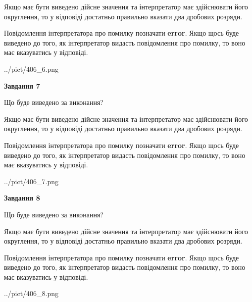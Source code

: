 \documentclass[12pt, ukrainian]{article}
\begin{document}
{\begin {Large}
Якщо має бути виведено дійсне значення та інтерпретатор має здійснювати його округлення, 
то у відповіді достатньо правильно вказати два дробових розряди.

Повідомлення інтерпретатора про помилку позначати \textbf{error}.
Якщо щось буде виведено до того, як інтерпретатор видасть повідомлення про помилку, 
то воно має вказуватись у відповіді. \par

\begin{center}
	{../pict/406_6.png}
\end{center}
\newpage

{\begin {center}\textbf{Завдання 7}\end {center}}\par
Що буде виведено за виконання? \par

Якщо має бути виведено дійсне значення та інтерпретатор має здійснювати його округлення, 
то у відповіді достатньо правильно вказати два дробових розряди.

Повідомлення інтерпретатора про помилку позначати \textbf{error}.
Якщо щось буде виведено до того, як інтерпретатор видасть повідомлення про помилку, 
то воно має вказуватись у відповіді. \par

\begin{center}
	{../pict/406_7.png}
\end{center}
\newpage

{\begin {center}\textbf{Завдання 8}\end {center}}\par
Що буде виведено за виконання? \par

Якщо має бути виведено дійсне значення та інтерпретатор має здійснювати його округлення, 
то у відповіді достатньо правильно вказати два дробових розряди.

Повідомлення інтерпретатора про помилку позначати \textbf{error}.
Якщо щось буде виведено до того, як інтерпретатор видасть повідомлення про помилку, 
то воно має вказуватись у відповіді. \par

\begin{center}
	{../pict/406_8.png}
\end{center}
\newpage


\end{Large}}
\end{document}

